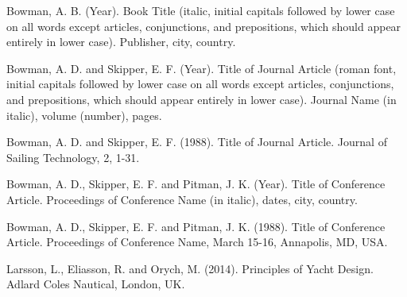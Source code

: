 \documentclass[A4paper,11pt]{marine_2023_Paper}
\begin{document}
Bowman, A. B. (Year). Book Title (italic, initial capitals followed by lower case on all words except articles, conjunctions, and prepositions, which should appear entirely in lower case). Publisher, city, country.

Bowman, A. D. and Skipper, E. F. (Year). Title of Journal Article (roman font, initial capitals followed by lower case on all words except articles, conjunctions, and prepositions, which should appear entirely in lower case). Journal Name (in italic), volume (number), pages.

Bowman, A. D. and Skipper, E. F. (1988). Title of Journal Article. Journal of Sailing Technology, 2, 1-31.

Bowman, A. D., Skipper, E. F. and Pitman, J. K. (Year). Title of Conference Article. Proceedings of Conference Name (in italic), dates, city, country.

Bowman, A. D., Skipper, E. F. and Pitman, J. K. (1988). Title of Conference Article. Proceedings of Conference Name, March 15-16, Annapolis, MD, USA.

Larsson, L., Eliasson, R. and Orych, M. (2014). Principles of Yacht Design. Adlard Coles Nautical, London, UK.
\end{document}
